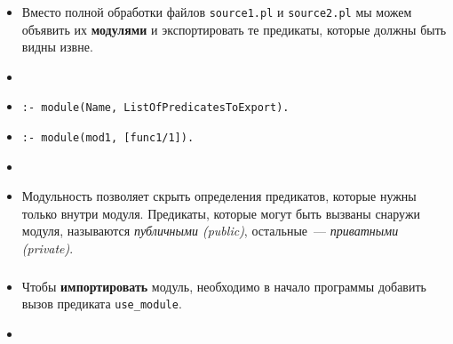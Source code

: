 \begin{frame}

	\frametitle{\insertsection}
	\framesubtitle{\insertsubsection}
	
	\begin{itemize}
		\item[] Вместо полной обработки файлов \texttt{source1.pl} и \texttt{source2.pl} мы можем объявить их \textbf{модулями} и экспортировать те предикаты, которые должны быть видны извне.
		\item[]
		\item[] \texttt{:- module(Name, ListOfPredicatesToExport).}
		\item[] \texttt{:- module(mod1, [func1/1]).}
		\item[]
		\item[] Модульность позволяет скрыть определения предикатов, которые нужны только внутри модуля. Предикаты, которые могут быть вызваны снаружи модуля, называются \textit{публичными (public)}, остальные~--- \textit{приватными (private)}.
	\end{itemize}

\end{frame}


\begin{frame}

	\frametitle{\insertsection}
	\framesubtitle{\insertsubsection}
	
	\begin{itemize}
		\item[] Чтобы \textbf{импортировать} модуль, необходимо в начало программы добавить вызов предиката \texttt{use\_module}.
		\item[]
	\end{itemize}

\end{frame}


